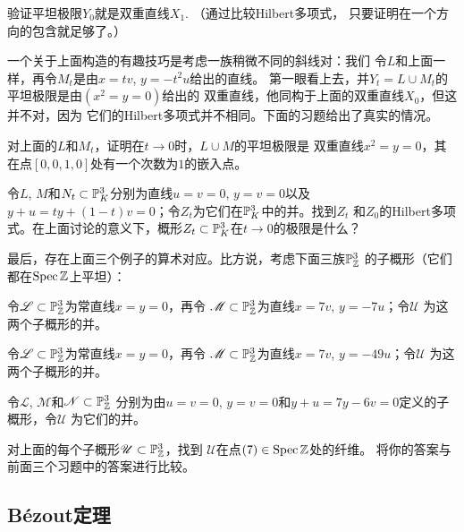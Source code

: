 \begin{exe}\label{exe:3.67}
验证平坦极限$Y_0$就是双重直线$X_1$. （通过比较Hilbert多项式，
只要证明在一个方向的包含就足够了。）
\end{exe}

一个关于上面构造的有趣技巧是考虑一族稍微不同的斜线对：我们
令$L$和上面一样，再令$M_t$是由$x=tv$, $y=-t^2u$给出的直线。
第一眼看上去，并$Y_t=L\cup M_t$的平坦极限是由$(x^2=y=0)$给出的
双重直线，他同构于上面的双重直线$X_0$，但这并不对，因为
它们的Hilbert多项式并不相同。下面的习题给出了真实的情况。

\begin{exe}\label{exe:3.68}
对上面的$L$和$M_t$，证明在$t\to 0$时，$L\cup M$的平坦极限是
双重直线$x^2=y=0$，其在点$[0,0,1,0]$处有一个次数为$1$的嵌入点。
\end{exe}


\begin{exe}\label{exe:3.69}
令$L$, $M$和$N_t\subset \P_K^3$分别为直线$u=v=0$, $y=v=0$以及
$y+u=ty+(1-t)v=0$；令$Z_t$为它们在$\P_K^3$中的并。找到$Z_t$
和$Z_0$的Hilbert多项式。在上面讨论的意义下，概形$Z_t\subset 
\P_K^3$在$t\to 0$的极限是什么？
\end{exe}


最后，存在上面三个例子的算术对应。比方说，考虑下面三族$\P_\zz^3$
的子概形（它们都在$\spec \zz$上平坦）：
\begin{compactenum}[(a)]
\item 令$\mathscr L\subset \P_\zz^3$为常直线$x=y=0$，再令
$\mathscr M\subset \P_\zz^3$为直线$x=7v$, $y=-7u$；令$\mathscr U$
为这两个子概形的并。
\item 令$\mathscr L\subset \P_\zz^3$为常直线$x=y=0$，再令
$\mathscr M\subset \P_\zz^3$为直线$x=7v$, $y=-49u$；令$\mathscr U$
为这两个子概形的并。
\item 令$\mathscr L$, $\mathscr M$和$\mathscr N\subset \P_\zz^3$
分别为由$u=v=0$, $y=v=0$和$y+u=7y-6v=0$定义的子概形，令$\mathscr U$
为它们的并。
\end{compactenum}

\begin{exe}\label{exe:3.70}
对上面的每个子概形$\mathscr U\subset \P_\zz^3$，找到
$\mathscr U$在点$(7)\in\spec \zz$处的纤维。
将你的答案与前面三个习题中的答案进行比较。
\end{exe}

\subsection{B\texorpdfstring{\'{e}}{é}zout定理}
\label{s:3.3.5}

